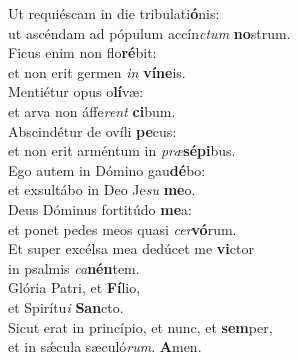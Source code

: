 \evenverse Ut requiéscam in die tribulati\textbf{ó}nis:~\*\\
\evenverse ut ascéndam ad pópulum accín\textit{ctum} \textbf{no}strum.\\
\oddverse Ficus enim non flo\textbf{ré}bit:~\*\\
\oddverse et non erit germen \textit{in} \textbf{ví}\textbf{ne}is.\\
\evenverse Mentiétur opus o\textbf{lí}væ:~\*\\
\evenverse et arva non áffe\textit{rent} \textbf{ci}bum.\\
\oddverse Abscindétur de ovíli \textbf{pe}cus:~\*\\
\oddverse et non erit arméntum in \textit{præ}\textbf{sé}\textbf{pi}bus.\\
\evenverse Ego autem in Dómino gau\textbf{dé}bo:~\*\\
\evenverse et exsultábo in Deo Je\textit{su} \textbf{me}o.\\
\oddverse Deus Dóminus fortitúdo \textbf{me}a:~\*\\
\oddverse et ponet pedes meos quasi \textit{cer}\textbf{vó}rum.\\
\evenverse Et super excélsa mea dedúcet me \textbf{vi}ctor~\*\\
\evenverse in psalmis \textit{ca}\textbf{nén}tem.\\
\oddverse Glória Patri, et \textbf{Fí}lio,~\*\\
\oddverse et Spirítu\textit{i} \textbf{San}cto.\\
\evenverse Sicut erat in princípio, et nunc, et \textbf{sem}per,~\*\\
\evenverse et in sǽcula sæculó\textit{rum}. \textbf{A}men.\\
